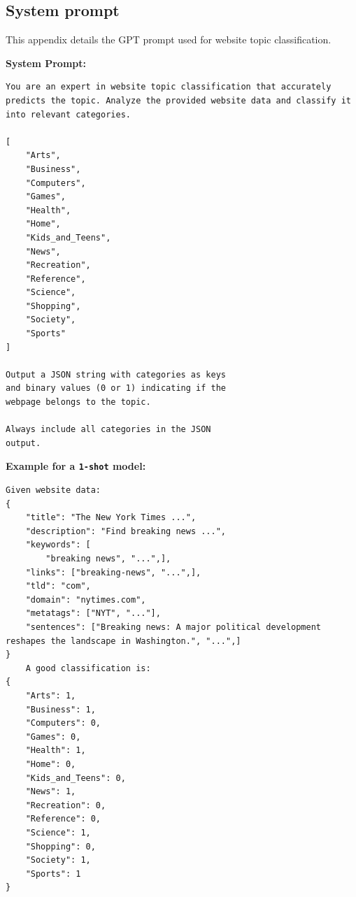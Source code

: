 \subsection{System prompt}\label{app:prompt}
This appendix details the GPT prompt used for website topic classification. 

\textbf{System Prompt:} 

\begin{lstlisting}
You are an expert in website topic classification that accurately predicts the topic. Analyze the provided website data and classify it into relevant categories.

[
    "Arts",
    "Business",
    "Computers",
    "Games",
    "Health",
    "Home", 
    "Kids_and_Teens",
    "News",
    "Recreation",
    "Reference",
    "Science", 
    "Shopping",
    "Society",
    "Sports"
]

Output a JSON string with categories as keys
and binary values (0 or 1) indicating if the 
webpage belongs to the topic. 

Always include all categories in the JSON
output.
\end{lstlisting}
\textbf{Example for a \texttt{1-shot} model:}
\begin{lstlisting}
Given website data:
{         
    "title": "The New York Times ...",
    "description": "Find breaking news ...",
    "keywords": [
        "breaking news", "...",],
    "links": ["breaking-news", "...",],
    "tld": "com",
    "domain": "nytimes.com",
    "metatags": ["NYT", "..."],
    "sentences": ["Breaking news: A major political development reshapes the landscape in Washington.", "...",]
}
    A good classification is:
{
    "Arts": 1,
    "Business": 1,
    "Computers": 0,
    "Games": 0,
    "Health": 1,
    "Home": 0,
    "Kids_and_Teens": 0,
    "News": 1,
    "Recreation": 0,
    "Reference": 0,
    "Science": 1,
    "Shopping": 0,
    "Society": 1,
    "Sports": 1
}
\end{lstlisting}


